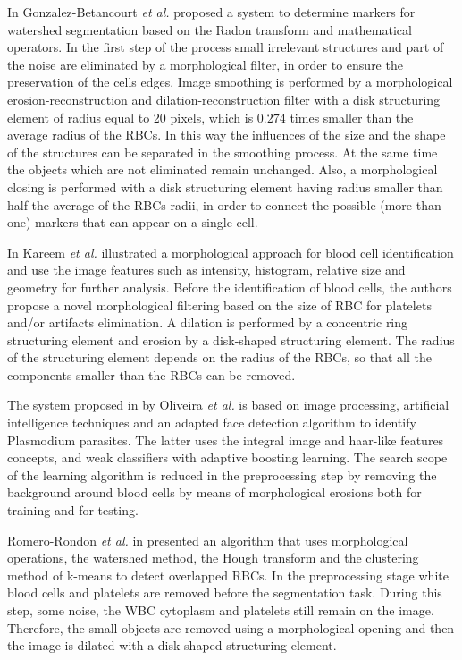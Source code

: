 \documentclass[sensors,review,submit,moreauthors,pdftex,10pt,a4paper]{mdpi}
\begin{document}
In \cite{Gonzalez2016} Gonzalez-Betancourt \emph{et al.} proposed a system to determine markers for watershed segmentation based on the Radon transform and mathematical operators. In the first step of the process small irrelevant structures and part of the noise are eliminated by a morphological filter, in order to ensure the preservation of the cells edges. Image smoothing is performed by a morphological erosion-reconstruction and dilation-reconstruction filter with a disk structuring element of radius equal to 20 pixels, which is $0.274$ times smaller than the average radius of the RBCs. In this way the influences of the size and the shape of the structures can be separated in the smoothing process. At the same time the objects which are not eliminated remain unchanged. Also, a morphological closing is performed with a disk structuring element having radius smaller than half the average of the RBCs radii, in order to connect the possible (more than one) markers that can appear on a single cell.

In \cite{Kareem2012} Kareem \emph{et al.} illustrated a morphological approach for blood cell identification and use the image features such as intensity, histogram, relative size and geometry for further analysis. Before the identification of blood cells, the authors  propose a novel morphological filtering based on the size of RBC for platelets and/or artifacts elimination. A dilation is performed by a concentric ring structuring element and erosion by a disk-shaped structuring element. The radius of the structuring element depends on the radius of the RBCs, so that all the components smaller than the RBCs can be removed.

The system proposed in \cite{Oliveira2017} by Oliveira \emph{et al.} is based on image processing, artificial intelligence techniques and an adapted face detection algorithm to identify Plasmodium parasites. The latter uses the integral image and haar-like features concepts, and weak classifiers with adaptive boosting learning. The search scope of the learning algorithm is reduced in the preprocessing step by removing the background around blood cells by means of morphological erosions both for training and for testing.

Romero-Rondon \emph{et al.} in \cite{Romero2016} presented an algorithm that uses morphological operations, the watershed method, the Hough transform and the clustering method of k-means to detect overlapped RBCs. In the preprocessing stage white blood cells and platelets are removed before the segmentation task. During this step, some noise, the WBC cytoplasm and platelets still remain on the image. Therefore, the small objects are removed using a morphological opening and then the image is dilated with a disk-shaped structuring element.
\end{document}
